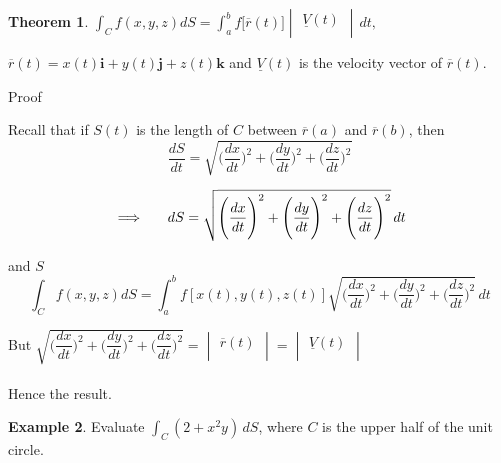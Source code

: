 \documentclass[11pt,a4paper]{article}
\theoremstyle{definition}
\newtheorem{thm}{Theorem}[subsection]
\newtheorem{exa}[thm]{Example}
\begin{document}
\begin{thm}


$\displaystyle{\int_C f(x,y,z)dS = \int^b_af\big[\overline{r}(t)\big]\begin{vmatrix}
\underline{V}(t)\\
\end{vmatrix}\,dt,
}$


\hspace{0.3cm}
$\overline{r}(t) = x(t)\textbf{i} + y(t)\textbf{j} + z(t)\textbf{k}$ and $\underline{V}(t)$ is the velocity vector of $\overline{r}(t)$.


{\color[wave]{485} Proof}


Recall that if $S(t)$ is the length of $C$ between $\overline{r}(a)$ and $\overline{r}(b)$, then 
$$\frac{dS}{dt} = \sqrt{\Bigg(\dfrac{dx}{dt}\Bigg)^2 + \Bigg(\dfrac{dy}{dt}\Bigg)^2 + \Bigg(\dfrac{dz}{dt}\Bigg)^2}$$

$$\implies \hspace{0.5cm} dS = \sqrt{\Bigg(\dfrac{dx}{dt}\Bigg)^2 + \Bigg(\dfrac{dy}{dt}\Bigg)^2 + \Bigg(\dfrac{dz}{dt}\Bigg)^2}\,dt$$

and $S$ 
$$\int_C f(x,y,z)dS = \int^b_a f[x(t),y(t),z(t)]\sqrt{\Bigg(\dfrac{dx}{dt}\Bigg)^2 + \Bigg(\dfrac{dy}{dt}\Bigg)^2 + \Bigg(\dfrac{dz}{dt}\Bigg)^2}\,dt$$

But 
\hspace{0.2cm}$\displaystyle{\sqrt{\Bigg(\dfrac{dx}{dt}\Bigg)^2 + \Bigg(\dfrac{dy}{dt}\Bigg)^2 + \Bigg(\dfrac{dz}{dt}\Bigg)^2} = \begin{vmatrix}
\overline{r}(t)\\
\end{vmatrix} = \begin{vmatrix}
\underline{V}(t)\\
\end{vmatrix}}$\\\\

Hence the result.
\end{thm}


\begin{exa}


Evaluate $\displaystyle{\int_C (2 +x^2y)\,dS}$, where $C$ is the upper half of the unit circle.
\end{exa}
\end{document}
